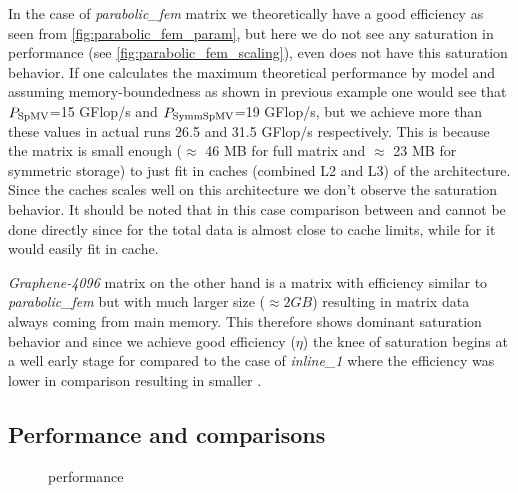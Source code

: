 In the case of \emph{parabolic\_fem} matrix we theoretically have a good efficiency as seen from \cref{fig:parabolic_fem_param}, but here we do not see any saturation in performance (see \cref{fig:parabolic_fem_scaling}), even \SpMV does not have this saturation behavior. If one calculates the maximum  theoretical performance by \roofline model and assuming memory-boundedness as shown in previous example one would see that $P_\mathrm{SpMV}$=15 GFlop/s and $P_\mathrm{SymmSpMV}$=19 GFlop/s, but we achieve more than these values in actual runs 26.5 and 31.5 GFlop/s respectively. This is because the matrix is small enough ($\approx$ 46 MB for full matrix and $\approx$ 23 MB for symmetric storage) to just fit in caches (combined L2 and L3) of the \SKX architecture. Since the caches scales well on this architecture we don't observe the saturation behavior. It should be noted that in this case comparison between \SpMV and \SymmSpmv cannot be done directly since for \SpMV the total data is almost close to cache limits, while for \SymmSpmv it would easily fit in cache.

\emph{Graphene-4096} matrix on the other hand is a matrix with efficiency similar to \emph{parabolic\_fem} but with much larger size ($\approx 2 GB$) resulting in matrix data always coming from main memory. This therefore shows dominant saturation behavior and since we achieve good efficiency ($\eta$) the knee of saturation begins at a well early stage for \SymmSpmv compared to  the case of \emph{inline\_1} where the efficiency was lower in comparison resulting in smaller \threadEff.

\subsection{Performance and comparisons}

\begin{figure}[thbp]
	\centering
	\hspace{1em}
	\caption{\SymmSpmv performance}
	\label{fig:ivy}
\end{figure}



